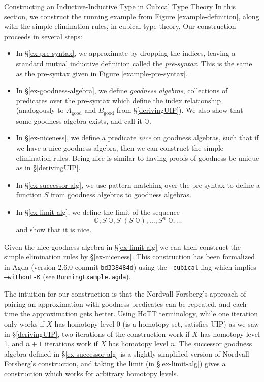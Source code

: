 \documentclass[runningheads]{llncs}
\newcommand{\good}[1]{{#1}_\text{good}}
\newcommand{\bbO}{\mathbb{O}}
\def\Forsberg/{Nordvall Forsberg}
\begin{document}
\begin{section}{Constructing an Inductive-Inductive Type in Cubical Type Theory}
In this section, we construct the running example from Figure \ref{example-definition}, along with the simple elimination rules, in cubical type theory. Our construction proceeds in several steps:
\begin{itemize}
    \item In \S\ref{ex-pre-syntax}, we approximate by dropping the indices, leaving a standard mutual inductive definition called the \emph{pre-syntax}. This is the same as the pre-syntax given in Figure \ref{example-pre-syntax}.
    \item In \S\ref{ex-goodness-algebra}, we define \emph{goodness algebras}, collections of predicates over the pre-syntax which define the index relationship (analogously to $\good{A}$ and $\good{B}$ from \S\ref{derivingUIP}). We also show that some goodness algebra exists, and call it $\bbO$.
    \item In \S\ref{ex-niceness}, we define a predicate \emph{nice} on goodness algebras, such that if we have a nice goodness algebra, then we can construct the simple elimination rules. Being nice is similar to having proofs of goodness be unique as in \S\ref{derivingUIP}.
    \item In \S\ref{ex-successor-alg}, we use pattern matching over the pre-syntax to define a function $S$ from goodness algebras to goodness algebras.
    \item In \S\ref{ex-limit-alg}, we define the limit of the sequence \[\bbO, S\;\bbO, S\;(S\;\bbO), \dots, S^n\;\bbO,\dots\] and show that it is nice.
\end{itemize}
Given the nice goodness algebra in \S\ref{ex-limit-alg} we can then construct the simple elimination rules by \S\ref{ex-niceness}. This construction has been formalized in Agda (version 2.6.0 commit \texttt{bd338484d}) using the \texttt{--cubical} flag which implies \texttt{--without-K} (see \texttt{RunningExample.agda}).

The intuition for our construction is that the \Forsberg/'s approach of pairing an approximation with goodness predicates can be repeated, and each time the approximation gets better. Using HoTT terminology, while one iteration only works if $X$ has homotopy level 0 (is a homotopy set, satisfies UIP) as we saw in \S\ref{derivingUIP}, two iterations of the construction work if $X$ has homotopy level 1, and $n+1$ iterations work if $X$ has homotopy level $n$. The successor goodness algebra defined in \S\ref{ex-successor-alg} is a slightly simplified version of \Forsberg/'s construction, and taking the limit (in \S\ref{ex-limit-alg}) gives a construction which works for arbitrary homotopy levels.


\end{section}
\end{document}
